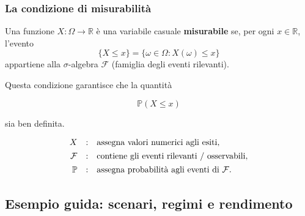 \documentclass[handout]{beamer}%
\providecommand{\Prob}{\mathbb{P}}
\providecommand{\F}{\mathcal{F}}
\providecommand{\1}{\mathbf{1}}
\providecommand{\QTR}[2]{\csname #1\endcsname{#2}}
\begin{document}
\begin{frame}%
%

\frametitle{La condizione di misurabilit\`{a}}%


Una funzione $X:\Omega\to\mathbb{R}$ \`{e} una variabile casuale
\textbf{misurabile} se, per ogni $x\in\mathbb{R}$, l'evento
\[
\{X\leq x\} = \{\omega\in\Omega:X(\omega)\leq x\}
\]
appartiene alla $\sigma$-algebra $\F$ (famiglia degli eventi rilevanti).



\medskip

Questa condizione garantisce che la quantit\`{a}%

\[
\Prob(X\leq x)
\]


sia ben definita.

\medskip%

\[%
\begin{array}
[c]{rcl}%
X & : & \mbox{assegna valori numerici agli esiti},\\[4pt]%
\F & : & \mbox{contiene gli eventi rilevanti / osservabili},\\[4pt]%
\Prob & : & \mbox{assegna probabilit\`{a} agli eventi di } \F.
\end{array}
\]
%

\transboxout
\end{frame}%




\subsection{Esempio guida: scenari, regimi e rendimento}%
\end{document}
